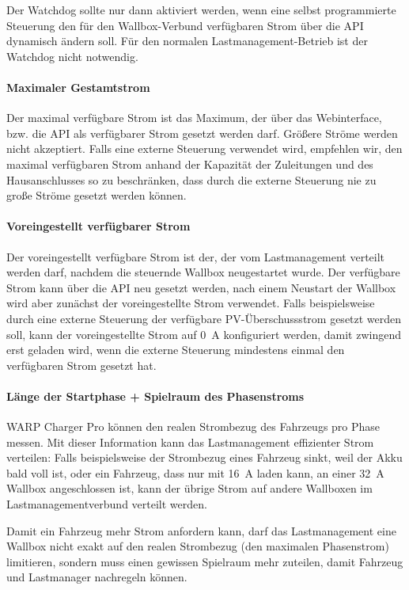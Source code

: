 \documentclass[a4paper,10pt]{article}
\newcommand{\hint}[1]{\begin{tcolorbox}[colback=boxgray,colframe=black,coltext=
white,title=Hinweis,left*=2mm,right*=2mm,boxsep=1mm,bottom=1mm,top=1mm]#1\end{tcolorbox}}
\begin{document}
\begin{multicols*}{2}
    \hint{Der Watchdog sollte nur dann aktiviert werden,
    wenn eine selbst programmierte Steuerung den für den Wallbox-Verbund verfügbaren Strom über die API dynamisch ändern soll.
    Für den normalen Lastmanagement-Betrieb ist der Watchdog nicht notwendig.}

    \paragraph{Maximaler Gestamtstrom}
    Der maximal verfügbare Strom ist das Maximum, der über das Webinterface, bzw. die API als verfügbarer Strom gesetzt werden darf.
    Größere Ströme werden nicht akzeptiert. Falls eine externe Steuerung verwendet wird, empfehlen wir, den maximal verfügbaren Strom
    anhand der Kapazität der Zuleitungen und des Hausanschlusses so zu beschränken, dass durch die externe Steuerung nie zu große
    Ströme gesetzt werden können.

    \paragraph{Voreingestellt verfügbarer Strom}
    Der voreingestellt verfügbare Strom ist der, der vom Lastmanagement verteilt werden darf, nachdem die steuernde Wallbox
    neugestartet wurde. Der verfügbare Strom kann über die API neu gesetzt werden, nach einem Neustart der Wallbox wird aber
    zunächst der voreingestellte Strom verwendet. Falls beispielsweise durch eine externe Steuerung der verfügbare PV-Überschussstrom
    gesetzt werden soll, kann der voreingestellte Strom auf \SI{0}{\ampere} konfiguriert werden, damit zwingend erst geladen wird,
    wenn die externe Steuerung mindestens einmal den verfügbaren Strom gesetzt
	hat.

    \paragraph{Länge der Startphase + Spielraum des Phasenstroms}
    WARP Charger Pro können den realen Strombezug des Fahrzeugs pro Phase messen.
    Mit dieser Information kann das Lastmanagement effizienter Strom verteilen: Falls beispielsweise
    der Strombezug eines Fahrzeug sinkt, weil der Akku bald voll ist, oder ein Fahrzeug, dass nur mit \SI{16}{\ampere}
    laden kann, an einer \SI{32}{\ampere} Wallbox angeschlossen ist, kann der übrige Strom auf andere Wallboxen
    im Lastmanagementverbund verteilt werden.

    Damit ein Fahrzeug mehr Strom anfordern kann, darf das Lastmanagement eine Wallbox nicht exakt
    auf den realen Strombezug (den maximalen Phasenstrom) limitieren, sondern muss einen gewissen Spielraum
    mehr zuteilen, damit Fahrzeug und Lastmanager nachregeln können.


\end{multicols*}
\end{document}
